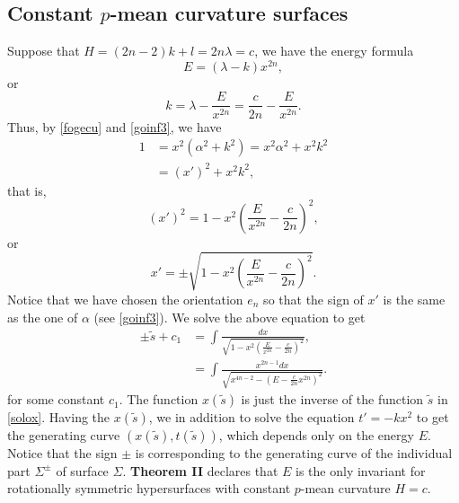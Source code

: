 \documentclass[12pt]{amsart}
\theoremstyle{definition}\newtheorem{exa}[thm]{\sc Example}
\theoremstyle{definition}\newtheorem{de}[thm]{\sc Definition}
\theoremstyle{definition}\newtheorem{rem}[thm]{\sc Remark}
\theoremstyle{definition}\newtheorem{prob}[thm]{\it Problem}
\theoremstyle{definition}\newtheorem{fact}[thm]{\sc Fact}
\theoremstyle{definition}\newtheorem{claim}[thm]{\sc Claim}
\numberwithin{equation}{section}
\begin{document}
\subsection{Constant $p$-mean curvature surfaces}
Suppose that $H=(2n-2)k+l=2n\lambda=c$, we have the energy formula
\begin{equation}\label{fomuE1}
E=(\lambda-k)x^{2n},\end{equation}
or
\begin{equation}\label{fomuE2}
k=\lambda-\frac{E}{x^{2n}}=\frac{c}{2n}-\frac{E}{x^{2n}}.
\end{equation}
Thus, by \eqref{fogecu} and \eqref{goinf3}, we have
\begin{equation}
\begin{split}
1&=x^{2}(\alpha^{2}+k^{2})=x^{2}\alpha^{2}+x^{2}k^{2}\\
&=(x')^{2}+x^{2}k^{2},
\end{split}
\end{equation}
that is,
\begin{equation}\label{reofafd}
(x')^{2}=1-x^{2}\left(\frac{E}{x^{2n}}-\frac{c}{2n}\right)^{2}, 
\end{equation}
or
\begin{equation}
x'=\pm\sqrt{1-x^{2}\left(\frac{E}{x^{2n}}-\frac{c}{2n}\right)^{2}}.
\end{equation}
Notice that we have chosen the orientation $e_{n}$ so that the sign of $x'$ is the same as the one of $\alpha$ (see \eqref{goinf3}).
We solve the above equation to get
\begin{equation}\label{solox}
\begin{split}
\pm \tilde{s}+c_{1}&=\int\frac{dx}{\sqrt{1-x^{2}\left(\frac{E}{x^{2n}}-\frac{c}{2n}\right)^{2}}},\\
&=\int\frac{x^{2n-1}dx}{\sqrt{x^{4n-2}-\left(E-\frac{c}{2n}x^{2n}\right)^{2}}}.
\end{split}
\end{equation}
for some constant $c_{1}$. The function $x(\tilde{s})$ is just the inverse of the function $\tilde{s}$ in \eqref{solox}. Having the $x(\tilde{s})$, we in addition to solve the equation $t'=-kx^{2}$ to get the generating curve $(x(\tilde{s}),t(\tilde{s}))$, which depends only on the energy $E$. Notice that the sign $\pm$ is corresponding to the generating curve of the individual part $\Sigma^{\pm}$ of surface $\Sigma$.
{\bf Theorem II} declares that $E$ is the only invariant for rotationally symmetric hypersurfaces with constant $p$-mean curvature $H=c$.
\end{document}
